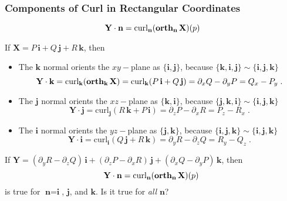 \begin{frame}
  \frametitle{Components of Curl in Rectangular Coordinates}

$$\textbf{Y} \cdot \textbf{n} = \text{curl}_{\textbf{n}} (\operatorname{\textbf{orth}}_{\textbf{n}} \textbf{X})(p)$$

If $\textbf{X}=P \, \textbf{i} + Q\, \textbf{j} + R\, \textbf{k}$, then
\begin{itemize}
  \item The $\textbf{k}$ normal orients the $xy-$plane as $\{ \textbf{i}, \textbf{j}\}$, because $\{\textbf{k}, \textbf{i}, \textbf{j}\} \sim \{\textbf{i}, \textbf{j}, \textbf{k}\}$
%
$$\textbf{Y} \cdot \textbf{k} = \text{curl}_{\textbf{k}} (\operatorname{\textbf{orth}}_{\textbf{k}} \textbf{X}) = \text{curl}_{\textbf{k}} (P\, \textbf{i} + Q\, \textbf{j}) = \partial_x Q - \partial_y P = Q_x - P_y\; .$$
%
\item \pause The $\textbf{j}$ normal orients the $xz-$plane as \pause $\{ \textbf{k}, \textbf{i}\}$, because $\{\textbf{j}, \textbf{k}, \textbf{i}\} \sim \{\textbf{i}, \textbf{j}, \textbf{k}\}$\pause
%
$$\textbf{Y} \cdot \textbf{j} = \text{curl}_{\textbf{j}} (R\, \textbf{k} + P\, \textbf{i}) = \partial_z P - \partial_x R = P_z - R_x\; .$$
%
\item \pause The $\textbf{i}$ normal orients the $yz-$plane as \pause $\{ \textbf{j}, \textbf{k}\}$, because $\{\textbf{i}, \textbf{j}, \textbf{k}\} \sim \{\textbf{i}, \textbf{j}, \textbf{k}\}$\pause
%
$$\textbf{Y} \cdot \textbf{i} = \text{curl}_{\textbf{i}} (Q\, \textbf{j} + R\, \textbf{k}) = \partial_y R - \partial_z Q = R_y - Q_z\; .$$
\end{itemize}

\pause If $\textbf{Y} = (\partial_y R - \partial_z Q) \, \textbf{i} +  (\partial_z P - \partial_x R) \, \textbf{j} + (\partial_x Q - \partial_y P) \, \textbf{k}$,
then
%
$$\textbf{Y} \cdot \textbf{n} = \text{curl}_{\textbf{n}} (\operatorname{\textbf{orth}}_{\textbf{n}} \textbf{X})(p) \; $$
%
is true for $\textbf{n} = \textbf{i}$, $\textbf{j}$, and $\textbf{k}$. \pause Is it true for \emph{all} $\textbf{n}$?

\end{frame}


